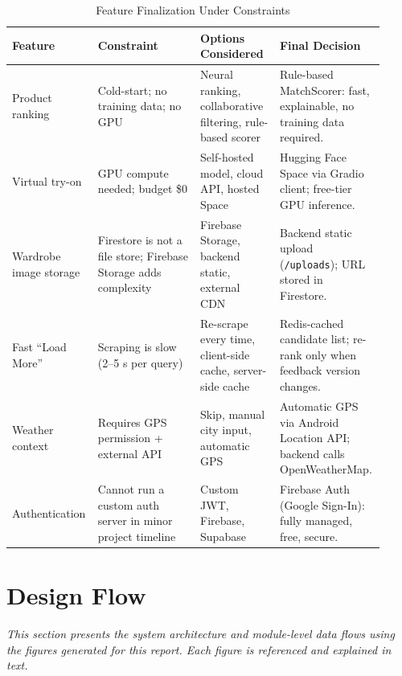 \documentclass[12pt,a4paper]{report}
\begin{document}
\vspace{4pt}
\begin{table}[H]
\centering
\caption{Feature Finalization Under Constraints}
\label{tab:finalize}
\begin{adjustbox}{max width=\linewidth}
\small\begin{tabular}{L{0.19\linewidth} L{0.27\linewidth} L{0.21\linewidth} L{0.25\linewidth}}
\toprule
\textbf{Feature} & \textbf{Constraint} & \textbf{Options Considered} & \textbf{Final Decision} \\
\midrule
Product ranking
  & Cold-start; no training data; no GPU
  & Neural ranking, collaborative filtering, rule-based scorer
  & Rule-based MatchScorer: fast, explainable, no training data required. \\
Virtual try-on
  & GPU compute needed; budget \$0
  & Self-hosted model, cloud API, hosted Space
  & Hugging Face Space via Gradio client; free-tier GPU inference. \\
Wardrobe image storage
  & Firestore is not a file store; Firebase Storage adds complexity
  & Firebase Storage, backend static, external CDN
  & Backend static upload (\texttt{/uploads}); URL stored in Firestore. \\
Fast ``Load More''
  & Scraping is slow (2--5 s per query)
  & Re-scrape every time, client-side cache, server-side cache
  & Redis-cached candidate list; re-rank only when feedback version changes. \\
Weather context
  & Requires GPS permission + external API
  & Skip, manual city input, automatic GPS
  & Automatic GPS via Android Location API; backend calls OpenWeatherMap. \\
Authentication
  & Cannot run a custom auth server in minor project timeline
  & Custom JWT, Firebase, Supabase
  & Firebase Auth (Google Sign-In): fully managed, free, secure. \\
\bottomrule
\end{tabular}
\end{adjustbox}
\end{table}

\section{Design Flow}

\textit{This section presents the system architecture and module-level data flows using the figures generated for this report. Each figure is referenced and explained in text.}
\end{document}
